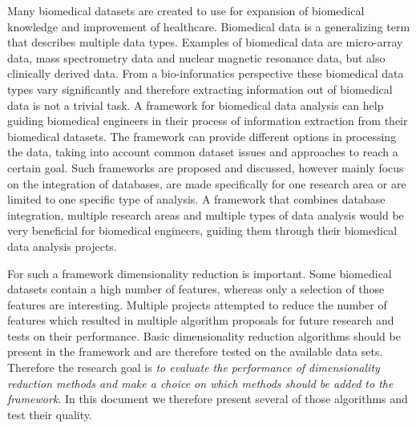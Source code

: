 \documentclass[10pt,a4paper]{article}
\begin{document}
	Many biomedical datasets are created to use for expansion of biomedical knowledge and improvement of healthcare. Biomedical data is a generalizing term that describes multiple data types\cite{gehlenborg2010visualization}. Examples of biomedical data are micro-array data\cite{brazma2001minimum}, mass spectrometry data\cite{cottrell1999probability, dettmer2007mass} and nuclear magnetic resonance data\cite{capitani2017nuclear}, but also clinically derived data\cite{liu2012data, sittig2008grand}. From a bio-informatics perspective these biomedical data types vary significantly\cite{gehlenborg2010visualization} and therefore extracting information out of biomedical data is not a trivial task. A framework for biomedical data analysis can help guiding biomedical engineers in their process of information extraction from their biomedical datasets. The framework can provide different options in processing the data, taking into account common dataset issues\cite{bertolazzi2008logic, piatetsky2003microarray,lommen2009metalign} and approaches to reach a certain goal\cite{holzinger2014knowledge, wilkins2009proteomics}. Such frameworks are proposed and discussed, however mainly focus on the integration of databases\cite{teodoro2009biomedical, doi:10.1093/nar/gkm1037}, are made specifically for one research area\cite{sturn2002genesis, karnovsky2011metscape, tabas2012genecodis3} or are limited to one specific type of analysis\cite{faul2007g}. A framework that combines database integration, multiple research areas and multiple types of data analysis would be very beneficial for biomedical engineers, guiding them through their biomedical data analysis projects.
	
	For such a framework dimensionality reduction is important. Some biomedical datasets contain a high number of features, whereas only a selection of those features are interesting. Multiple projects attempted to reduce the number of features\cite{baumgartner2006data, welthagen2005comprehensive} which resulted in multiple algorithm proposals for future research\cite{lim2003planar, peng2010novel, biesiada2007feature, ding2005minimum} and tests on their performance\cite{catal2009investigating, liu2002comparative}. Basic dimensionality reduction algorithms should be present in the framework and are therefore tested on the available data sets. Therefore the research goal is \emph{to evaluate the performance of dimensionality reduction methods and make a choice on which methods should be added to the framework}. In this document we therefore present several of those algorithms and test their quality.
	
\end{document}
